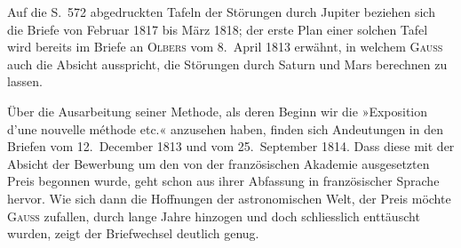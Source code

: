 \par\noindent\hspace*{\parindent}Auf die S.~572 abgedruckten Tafeln der Störungen durch Jupiter beziehen sich die Briefe von
Februar 1817 bis März 1818; der erste Plan einer solchen Tafel wird bereits im Briefe an \textsc{Olbers} vom
8.~April 1813 erwähnt, in welchem \textsc{Gauss} auch die Absicht ausspricht, die Störungen durch Saturn und
Mars berechnen zu lassen.

\par\noindent\hspace*{\parindent}Über die Ausarbeitung seiner Methode, als deren Beginn wir die »Exposition d’une nouvelle méthode
etc.« anzusehen haben, finden sich Andeutungen in den Briefen vom 12.~December 1813 und vom 25.~September
1814. Dass diese mit der Absicht der Bewerbung um den von der französischen Akademie ausgesetzten
Preis begonnen wurde, geht schon aus ihrer Abfassung in französischer Sprache hervor. Wie sich
dann die Hoffnungen der astronomischen Welt, der Preis möchte \textsc{Gauss} zufallen, durch lange Jahre hinzogen
und doch schliesslich enttäuscht wurden, zeigt der Briefwechsel deutlich genug.
\endgroup
\clearpage
\endgroup
